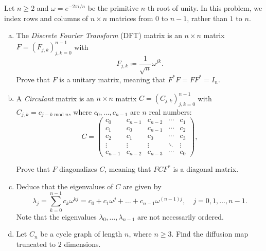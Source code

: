 \begin{myexercise}\label{prob:truncated_diffusion_map_cycle}
    Let $n \geq 2$ and $\omega = e^{-2\pi i / n} $ be the primitive $n$-th root of unity. In this problem, we index rows and columns of $n \times n$ matrices from $0$ to $n-1$, rather than $1$ to $n$.
    \begin{enumerate}[(a)]
        \item The \emph{Discrete Fourier Transform} (DFT) matrix   
        is an $n \times n$ matrix $F = (F_{j,k})_{j,k=0}^{n-1}$ with
        \begin{equation*}
            F_{j,k} \coloneqq \frac{1}{\sqrt{n}}\omega^{jk}.
        \end{equation*}
        Prove that $F$ is a unitary matrix, meaning that $F^*F = FF^* = I_n$. 
        
        \item A \emph{Circulant} matrix is an $n \times n$ matrix $C = (C_{j,k})_{j,k=0}^{n-1}$ with $C_{j,k} = c_{j-k \text{ mod }n}$, where $c_0, \ldots, c_{n-1}$ are $n$ real numbers:
        \begin{equation*}
            C = 
            \begin{pmatrix}
                c_0 & c_{n-1} & c_{n-2} & \cdots & c_{1}\\
                c_{1} & c_0 & c_{n-1} & \cdots & c_{2}\\
                c_{2} & c_{1} & c_0 & \cdots & c_{3}\\
                \vdots & \vdots & \vdots & \ddots & \vdots \\
                c_{n-1} & c_{n-2} & c_{n-3} & \cdots & c_0
            \end{pmatrix},
        \end{equation*}

        Prove that $F$ diagonalizes $C$, meaning that $FCF^*$ is a diagonal matrix.
        
        \item Deduce that the eigenvalues of $C$ are given by
        \begin{equation*}
            \lambda_j = \sum_{k=0}^{n-1} c_k \omega^{kj} = c_0 + c_1 \omega^{j} + \dots + c_{n-1} \omega^{(n-1)j}, \quad j = 0, 1, \ldots, n-1.
        \end{equation*}
        Note that the eigenvalues $\lambda_0, \ldots, \lambda_{n-1}$ are not necessarily ordered.

        \item Let $C_n$ be a cycle graph of length $n$, where $n \geq 3$. Find the diffusion map truncated to $2$ dimensions.
    \end{enumerate}
\end{myexercise}

